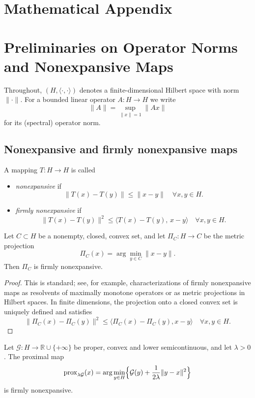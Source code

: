 \documentclass[11pt]{article}
\begin{document}
\appendix
\section*{Mathematical Appendix}

\section{Preliminaries on Operator Norms and Nonexpansive Maps}

Throughout, $(H,\langle\cdot,\cdot\rangle)$ denotes a finite-dimensional Hilbert space
with norm $\|\cdot\|$. For a bounded linear operator $A:H\to H$ we write
\[
  \|A\| = \sup_{\|x\|=1} \|Ax\|
\]
for its (spectral) operator norm.

\subsection{Nonexpansive and firmly nonexpansive maps}

\begin{definition}
A mapping $T:H\to H$ is called
\begin{itemize}[leftmargin=*]
  \item \emph{nonexpansive} if
    \[
      \|T(x) - T(y)\| \le \|x - y\|\quad\forall x,y\in H.
    \]
  \item \emph{firmly nonexpansive} if
    \[
      \|T(x)-T(y)\|^2 \le \langle T(x)-T(y),\, x-y\rangle
      \quad\forall x,y\in H.
    \]
\end{itemize}
\end{definition}

\begin{lemma}
Let $C\subset H$ be a nonempty, closed, convex set, and let $\Pi_C:H\to C$ be the metric projection
\[
  \Pi_C(x) = \arg\min_{y\in C} \|x-y\|.
\]
Then $\Pi_C$ is firmly nonexpansive.
\end{lemma}

\begin{proof}
This is standard; see, for example, characterizations of firmly nonexpansive maps as resolvents of maximally monotone operators or as metric projections in Hilbert spaces. In finite dimensions, the projection onto a closed convex set is uniquely defined and satisfies
\[
  \|\Pi_C(x)-\Pi_C(y)\|^2
  \le \langle \Pi_C(x)-\Pi_C(y), x-y\rangle\quad\forall x,y\in H.
\]
\end{proof}

\begin{lemma}
Let $\mathcal{G}:H\to\mathbb{R}\cup\{+\infty\}$ be proper, convex and lower semicontinuous, and let $\lambda>0$.
The proximal map
\[
  \operatorname{prox}_{\lambda\mathcal{G}}(x)
  = \arg\min_{y\in H} \Bigl\{\mathcal{G}(y) + \frac{1}{2\lambda}\|y-x\|^2\Bigr\}
\]
is firmly nonexpansive.
\end{lemma}
\end{document}
